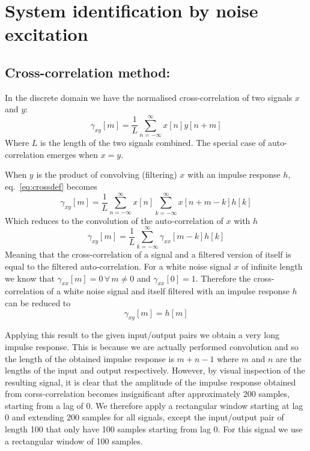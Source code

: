 \section{System identification by noise excitation}
\subsection{Cross-correlation method:}
In the discrete domain we have the normalised cross-correlation of two signals \(x\) and \(y\):
\begin{equation}
	\gamma_{xy}[m] = \frac{1}{L}\sum_{n=-\infty}^{\infty} x[n]y[n+m]
	\label{eq:crossdef}
\end{equation}
Where \(L\) is the length of the two signals combined. The special case of auto-correlation emerges when \(x=y\). 

When \(y\) is the product of convolving (filtering) \(x\) with an impulse response \(h\), eq.~\ref{eq:crossdef} becomes
\begin{equation*}
	\gamma_{xy}[m] = \frac{1}{L}\sum_{n=-\infty}^{\infty}x[n]\sum_{k=-\infty}^\infty x[n+m-k]h[k]
\end{equation*}
Which reduces to the convolution of the auto-correlation of \(x\) with \(h\)
\begin{equation*}
	\gamma_{xy}[m] = \frac{1}{L}\sum_{k=-\infty}^\infty \gamma_{xx}[m-k]h[k]
\end{equation*}
Meaning that the cross-correlation of a signal and a filtered version of itself is equal to the filtered auto-correlation. 
For a white noise signal \(x\) of infinite length we know that \(\gamma_{xx}[m]=0\, \forall\, m\neq 0\) and \(\gamma_{xx}[0]=1\).
Therefore the cross-correlation of a white noise signal and itself filtered with an impulse response \(h\) can be reduced to
\begin{equation*}
	\gamma_{xy}[m] = h[m]
\end{equation*}

Applying this result to the given input/output pairs we obtain a very long impulse response. This is because we are actually 
performed convolution and so the length
of the obtained impulse response is \(m+n-1\) where \(m\) and \(n\) are the lengths of the input and output respectively.
However, by visual inspection of the resulting signal, it is clear that the amplitude of the impulse response obtained from
corss-correlation becomes 
insignificant after approximately 200 samples, starting from a lag of 0. We therefore apply a rectangular window starting at
lag 0 and extending 200 samples for all signals, except the input/output pair of length 100 that only have 100 samples starting
from lag 0. For this signal we use a rectangular window of 100 samples.

